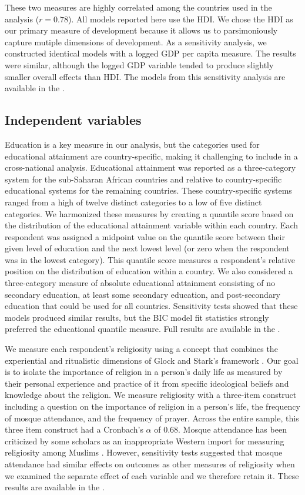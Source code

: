 \documentclass[10pt,letterpaper]{article}
\begin{document}
These two measures are highly correlated among the countries used in the
analysis (\(r=0.78\)). All models reported here use the HDI. We chose
the HDI as our primary measure of development because it allows us to
parsimoniously capture mutiple dimensions of development. As a
sensitivity analysis, we constructed identical models with a logged GDP
per capita measure. The results were similar, although the logged GDP
variable tended to produce slightly smaller overall effects than HDI.
The models from this sensitivity analysis are available in the
.

\subsection*{Independent variables}

Education is a key measure in our analysis, but the categories used for
educational attainment are country-specific, making it challenging to
include in a cross-national analysis. Educational attainment was
reported as a three-category system for the sub-Saharan African
countries and relative to country-specific educational systems for the
remaining countries. These country-specific systems ranged from a high
of twelve distinct categories to a low of five distinct categories. We
harmonized these measures by creating a quantile score based on the
distribution of the educational attainment variable within each country.
Each respondent was assigned a midpoint value on the quantile score
between their given level of education and the next lowest level (or
zero when the respondent was in the lowest category). This quantile
score measures a respondent's relative position on the distribution of
education within a country. We also considered a three-category measure
of absolute educational attainment consisting of no secondary education,
at least some secondary education, and post-secondary education that
could be used for all countries. Sensitivity tests showed that these
models produced similar results, but the BIC model fit statistics
strongly preferred the educational quantile measure. Full results are
available in the .

We measure each respondent's religiosity using a concept that combines
the experiential and ritualistic dimensions of Glock and Stark's framework \cite{glock_religion_1965}. Our goal is to isolate the
importance of religion in a person's daily life as measured by their
personal experience and practice of it from specific ideological beliefs
and knowledge about the religion. We measure religiosity with a
three-item construct including a question on the importance of religion
in a person's life, the frequency of mosque attendance, and the
frequency of prayer. Across the entire sample, this three item construct
had a Cronbach's \(\alpha\) of 0.68. Mosque attendance has been
criticized by some scholars as an inappropriate Western import for
measuring religiosity among Muslims \cite{el-menouar_five_2014}.
However, sensitivity tests suggested that mosque attendance had similar
effects on outcomes as other measures of religiosity when we examined
the separate effect of each variable and we therefore retain it. These
results are available in the .
\end{document}
